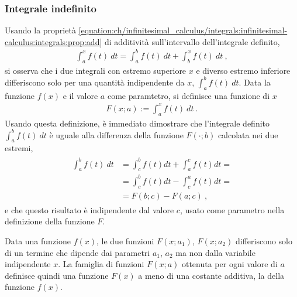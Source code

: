 \documentclass[letterpaper,10pt,italian]{jupyterBook}
\begin{document}
\subsubsection{Integrale indefinito}
\label{\detokenize{ch/infinitesimal_calculus/integrals:integrale-indefinito}}
\sphinxAtStartPar
Usando la proprietà \eqref{equation:ch/infinitesimal_calculus/integrals:infinitesimal-calculus:integrals:prop:add} di additività sull’intervallo dell’integrale definito,
\begin{equation*}
\begin{split}\int_a^x f(t) \ dt = \int_a^b f(t) \ dt + \int_b^x f(t) \ dt \ , \end{split}
\end{equation*}
\sphinxAtStartPar
si osserva che i due integrali con estremo superiore \(x\) e diverso estremo inferiore differiscono solo per una quantità indipendente da \(x\), \(\int_{a}^{b} f(t) \ dt\). Data la funzione \(f(x)\) e il valore \(a\) come paramtetro, si definisce una funzione di \(x\)
\begin{equation}\label{equation:ch/infinitesimal_calculus/integrals:infinitesimal-calculus:integrals:primi-}
\begin{split}F(x;a) := \int_a^x f(t) \ dt \ .\end{split}
\end{equation}
\sphinxAtStartPar
Usando questa definizione, è immediato dimostrare che l’integrale definito \(\int_{a}^{b} f(t) \ dt\) è uguale alla differenza della funzione \(F(\cdot; b)\) calcolata nei due estremi,
\begin{equation*}
\begin{split}\begin{aligned}
  \int_{a}^{b} f(t) \ dt & = \int_{c}^{b} f(t) dt + \int_{a}^{c} f(t) dt = \\ 
                         & = \int_{c}^{b} f(t) dt - \int_{c}^{a} f(t) dt = \\
                         & = F(b;c) - F(a;c) \ ,
\end{aligned}\end{split}
\end{equation*}
\sphinxAtStartPar
e che questo risultato è indipendente dal valore \(c\), usato come parametro nella definizione della funzione \(F\).

\sphinxAtStartPar
Data una funzione \(f(x)\), le due funzioni \(F(x;a_1)\), \(F(x;a_2)\) differiscono solo di un termine che dipende dai parametri \(a_1\), \(a_2\) ma non dalla variabile indipendente \(x\). La famiglia di funzioni \(F(x;a)\) ottenuta per ogni valore di \(a\) definisce quindi una funzione \(F(x)\) a meno di una costante additiva, la  della funzione \(f(x)\).
\end{document}
